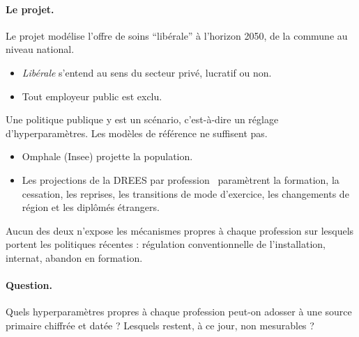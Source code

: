 \paragraph{Le projet.}
Le projet modélise l'offre de soins \enquote{libérale} à l'horizon 2050, de
la commune au niveau national.
\begin{itemize}
\item \emph{Libérale} s'entend au sens du secteur privé, lucratif ou non.
\item Tout employeur public est exclu.
\end{itemize}
Une politique publique y est un scénario, c'est-à-dire un réglage
d'hyperparamètres. Les modèles de référence ne suffisent pas.
\begin{itemize}
\item Omphale (Insee) projette la population.
\item Les projections de la DREES par profession~\cite{a1-dd76,a1-er1062,a1-er1075,a1-er1319}
  paramètrent la formation, la cessation, les reprises, les transitions de
  mode d'exercice, les changements de région et les diplômés étrangers.
\end{itemize}
Aucun des deux n'expose les mécanismes propres à chaque profession sur
lesquels portent les politiques récentes : régulation conventionnelle de
l'installation, internat, abandon en formation.

\paragraph{Question.}
Quels hyperparamètres propres à chaque profession peut-on adosser à une
source primaire chiffrée et datée ? Lesquels restent, à ce jour, non
mesurables ?

